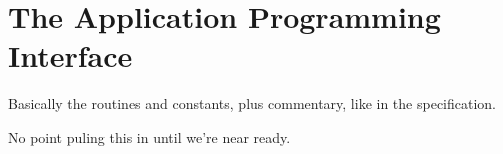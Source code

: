 %
% 
% 
% 
% 
% 
% 
%

\chapter{The \openshmem Application Programming Interface}

Basically the routines and constants, plus commentary, like in the
specification.

No point puling this in until we're near ready.

